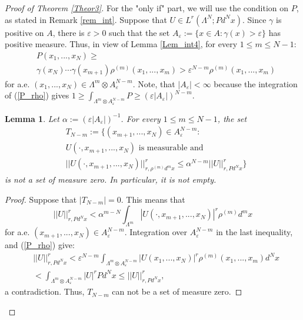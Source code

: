 \documentclass[12pt,leqno]{amsart}
\newtheorem{lem}[theor]{Lemma}{\bf}{\it}
\numberwithin{equation}{section}
\numberwithin{theor}{section}
\numberwithin{rem}{section}
\begin{document}
\begin{proof}[Proof of Theorem \ref{Theor3}]
For the "only if" part, we will use the condition on $P$, as stated in Remark \ref{rem_int}.  Suppose that $U\in L^{r}(\Lambda^N; P d^{N}x)$.  Since $\gamma$ is positive on $A$, there is 
$\varepsilon >0$ such that the set 
$A_{\varepsilon}:=\{x\in A : \gamma(x) > \varepsilon \} $ has positive measure.  Thus, in view of Lemma 
\ref{Lem_int4}, for every $1\leq m\leq N-1$:
\begin{equation}
\label{P_rho}
\begin{split}
&P(x_{1},...,x_N)\geq \\
&\gamma(x_N)\cdots\gamma(x_{m+1})
\rho^{(m)}(x_1,...,x_m)>\varepsilon^{N-m} \rho^{(m)}(x_1,...,x_m)
\end{split}
\end{equation}
for a.e. $(x_{1},...,x_N)\in \Lambda^{m}\otimes 
A_{\varepsilon}^{N-m}$.  
Note, that $|A_{\varepsilon}|<\infty$ because the integration 
of (\ref{P_rho}) gives $1\geq \int_{\Lambda^m\otimes 
A_{\varepsilon}^{N-m}} P \geq \left (\varepsilon |A_{\varepsilon}|\right )^{N-m}$.  
\begin{lem}
\label{Lem_int5}
Let $\alpha:=\left (\varepsilon |A_{\varepsilon}|\right )^{-1}$.  
For every $1\leq m\leq N-1$, the set 
\begin{equation}
\label{def_T_N-1}
\begin{split}
&T_{N-m}:=
\{(x_{m+1},...,x_N)\in A_{\varepsilon}^{N-m} : \\
&\text{$U(\cdot,x_{m+1},...,x_N)$ is measurable and} \\
&|| U(\cdot,x_{m+1},...,x_N)||_{r,\rho^{(m)} d^{m}x }^r \leq 
\alpha^{N-m} || U ||_{r,Pd^{N}x }^r \}
\end{split}
\end{equation}
is not a set of measure zero.  In particular, it is not empty.  
\end{lem}
\begin{proof}
Suppose that $| T_{N-m}|=0$.  This means that 
\begin{equation}
\label{case1_contr1}
|| U ||_{r,Pd^{N}x }^r<\alpha^{m-N} 
\int_{\Lambda^m} | U(\cdot,x_{m+1},...,x_N) |^{r} \rho^{(m)}d^{m} x 
\end{equation}
for a.e. $(x_{m+1},...,x_N)\in A_{\varepsilon}^{N-m} $.  Integration 
over $ A_{\varepsilon}^{N-m}$ in the last inequality, and 
(\ref{P_rho}) give:
\begin{equation}
\begin{split}
\label{case1_contr2}
&|| U ||_{r,Pd^{N}x }^r<\varepsilon^{N-m} 
\int_{\Lambda^m\otimes A_{\varepsilon}^{N-m}} | U(x_1,...,x_N) |^{r} \rho^{(m)}(x_1,...,x_m) d^{N}x\\
&<\int_{\Lambda^m\otimes A_{\varepsilon}^{N-m}} | U |^{r}
P d^{N}x\leq|| U ||_{r,Pd^{N}x }^r, 
\end{split}
\end{equation}
a contradiction.  Thus, $T_{N-m}$ can not be a set of measure zero.  
\end{proof}


\end{proof}
\end{document}
